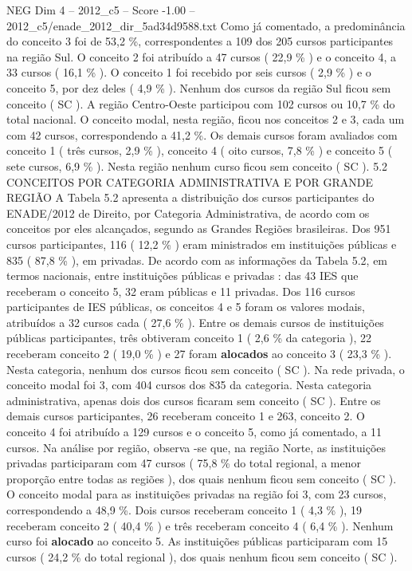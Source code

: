 \begin{textsample}{NEG Dim 4 – 2012\_c5 – Score -1.00 – 2012\_c5/enade\_2012\_dir\_5ad34d9588.txt}
Como já comentado, a predominância do conceito 3 foi de 53,2 \%, correspondentes a 109 dos 205 cursos participantes na região Sul.
O conceito 2 foi atribuído a 47 cursos ( 22,9 \% ) e o conceito 4, a 33 cursos ( 16,1 \% ).
O conceito 1 foi recebido por seis cursos ( 2,9 \% ) e o conceito 5, por dez deles ( 4,9 \% ).
Nenhum dos cursos da região Sul ficou sem conceito ( SC ).
A região Centro-Oeste participou com 102 cursos ou 10,7 \% do total nacional.
O conceito modal, nesta região, ficou nos conceitos 2 e 3, cada um com 42 cursos, correspondendo a 41,2 \%.
Os demais cursos foram avaliados com conceito 1 ( três cursos, 2,9 \% ), conceito 4 ( oito cursos, 7,8 \% ) e conceito 5 ( sete cursos, 6,9 \% ).
Nesta região nenhum curso ficou sem conceito ( SC ). 5.2 CONCEITOS POR CATEGORIA ADMINISTRATIVA E POR GRANDE REGIÃO A Tabela 5.2 apresenta a distribuição dos cursos participantes do ENADE/2012 de Direito, por Categoria Administrativa, de acordo com os conceitos por eles alcançados, segundo as Grandes Regiões brasileiras.
Dos 951 cursos participantes, 116 ( 12,2 \% ) eram ministrados em instituições públicas e 835 ( 87,8 \% ), em privadas.
De acordo com as informações da Tabela 5.2, em termos nacionais, entre instituições públicas e privadas : das 43 IES que receberam o conceito 5, 32 eram públicas e 11 privadas.
Dos 116 cursos participantes de IES públicas, os conceitos 4 e 5 foram os valores modais, atribuídos a 32 cursos cada ( 27,6 \% ).
Entre os demais cursos de instituições públicas participantes, três obtiveram conceito 1 ( 2,6 \% da categoria ), 22 receberam conceito 2 ( 19,0 \% ) e 27 foram \textbf{alocados} ao conceito 3 ( 23,3 \% ).
Nesta categoria, nenhum dos cursos ficou sem conceito ( SC ).
Na rede privada, o conceito modal foi 3, com 404 cursos dos 835 da categoria.
Nesta categoria administrativa, apenas dois dos cursos ficaram sem conceito ( SC ).
Entre os demais cursos participantes, 26 receberam conceito 1 e 263, conceito 2.
O conceito 4 foi atribuído a 129 cursos e o conceito 5, como já comentado, a 11 cursos.
Na análise por região, observa -se que, na região Norte, as instituições privadas participaram com 47 cursos ( 75,8 \% do total regional, a menor proporção entre todas as regiões ), dos quais nenhum ficou sem conceito ( SC ).
O conceito modal para as instituições privadas na região foi 3, com 23 cursos, correspondendo a 48,9 \%.
Dois cursos receberam conceito 1 ( 4,3 \% ), 19 receberam conceito 2 ( 40,4 \% ) e três receberam conceito 4 ( 6,4 \% ).
Nenhum curso foi \textbf{alocado} ao conceito 5.
As instituições públicas participaram com 15 cursos ( 24,2 \% do total regional ), dos quais nenhum ficou sem conceito ( SC ).

\end{textsample}

